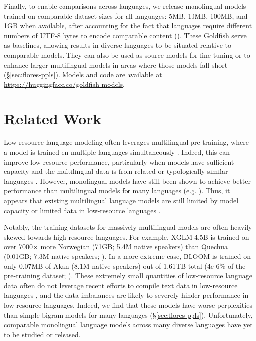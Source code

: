 \documentclass[11pt]{article}
\begin{document}
Finally, to enable comparisons across languages, we release monolingual models trained on comparable dataset sizes for all languages: 5MB, 10MB, 100MB, and 1GB when available, after accounting for the fact that languages require different numbers of UTF-8 bytes to encode comparable content (\citealp{arnett2024bit}).
These Goldfish serve as baselines, allowing results in diverse languages to be situated relative to comparable models.
They can also be used as source models for fine-tuning or to enhance larger multilingual models in areas where those models fall short (\S\ref{sec:flores-ppls}).
Models and code are available at \url{https://huggingface.co/goldfish-models}.


\section{Related Work}
Low resource language modeling often leverages multilingual pre-training, where a model is trained on multiple languages simultaneously \citep{pires2019multilingual,conneau-etal-2020-unsupervised}.
Indeed, this can improve low-resource performance, particularly when models have sufficient capacity and the multilingual data is from related or typologically similar languages \citep{kakwani2020indicnlpsuite,ogueji2021small,chang-etal-2023-multilinguality}.
However, monolingual models have still been shown to achieve better performance than multilingual models for many languages (e.g. \citealp{martin-etal-2020-camembert,pyysalo-etal-2021-wikibert,gutierrez2021maria,luukkonen-etal-2023-fingpt}).
Thus, it appears that existing multilingual language models are still limited by model capacity or limited data in low-resource languages \citep{conneau-etal-2020-unsupervised,chang-etal-2023-multilinguality}.

Notably, the training datasets for massively multilingual models are often heavily skewed towards high-resource languages.
For example, XGLM 4.5B is trained on over 7000$\times$ more Norwegian (71GB; 5.4M native speakers) than Quechua (0.01GB; 7.3M native speakers; \citealp{lin2022xglm,ethnologue-2024}).
In a more extreme case, BLOOM is trained on only 0.07MB of Akan (8.1M native speakers) out of 1.61TB total (\mbox{4e-6}\% of the pre-training dataset; \citealp{bigscience-bloom}).
These extremely small quantities of low-resource language data often do not leverage recent efforts to compile text data in low-resource languages \citep{costa2022no,imanigooghari-etal-2023-glot500,kudugunta-etal-2023-madlad400}, and the data imbalances are likely to severely hinder performance in low-resource languages.
Indeed, we find that these models have worse perplexities than simple bigram models for many languages (\S\ref{sec:flores-ppls}).
Unfortunately, comparable monolingual language models across many diverse languages have yet to be studied or released.
\end{document}

